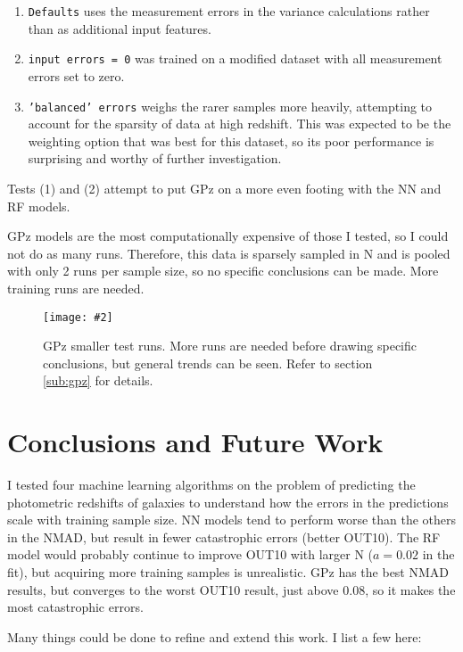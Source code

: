 \documentclass[13pt]{amsart}
\newcommand{\figscale}[4]{
\begin{figure}[ht]
    \centering
    \caption{#3}
    \label{#4}
    \texttt{[image: \#2]}
\end{figure}
}
\begin{document}
    \begin{enumerate}
      \item \texttt{Defaults} uses the measurement errors in the variance calculations rather than as additional input features.

      \item \texttt{input errors = 0} was trained on a modified dataset with all measurement errors set to zero.

      \item \texttt{'balanced' errors} weighs the rarer samples more heavily, attempting to account for the sparsity of data at high redshift. This was expected to be the weighting option that was best for this dataset, so its poor performance is surprising and worthy of further investigation.
    \end{enumerate}

    Tests (1) and (2) attempt to put GPz on a more even footing with the NN and RF models.

    GPz models are the most computationally expensive of those I tested, so I could not do as many runs. Therefore, this data is sparsely sampled in N and is pooled with only 2 runs per sample size, so no specific conclusions can be made. More training runs are needed.


    \figscale{1}{../data/errors_plots/errors_GPz.png}{GPz smaller test runs. More runs are needed before drawing specific conclusions, but general trends can be seen. Refer to section \ref{sub:gpz} for details.}{fig:errsGPz}





\section{Conclusions and Future Work}

  I tested four machine learning algorithms on the problem of predicting the photometric redshifts of galaxies to understand how the errors in the predictions scale with training sample size. NN models tend to perform worse than the others in the NMAD, but result in fewer catastrophic errors (better OUT10). The RF model would probably continue to improve OUT10 with larger N ($a = 0.02$ in the fit), but acquiring more training samples is unrealistic. GPz has the best NMAD results, but converges to the worst OUT10 result, just above 0.08, so it makes the most catastrophic errors.

  Many things could be done to refine and extend this work. I list a few here:
\end{document}
